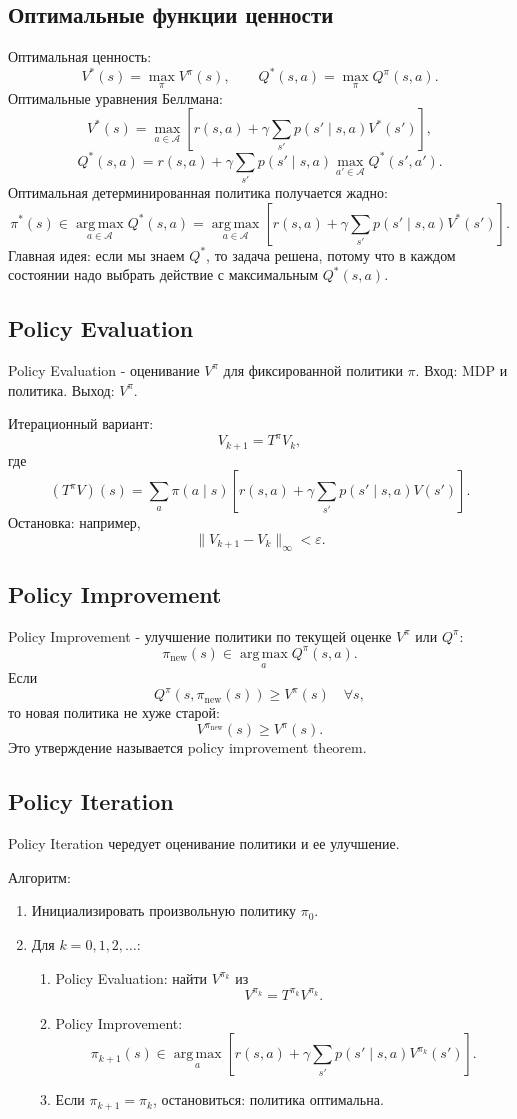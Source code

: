 \documentclass[11pt,a4paper]{article}
\newcommand{\argmax}{\operatorname*{arg\,max}}
\newcommand{\1}{\mathbf{1}}
\newcommand{\cA}{\mathcal A}
\begin{document}
\subsection*{Оптимальные функции ценности}
Оптимальная ценность:
\[
    V^*(s)=\max_\pi V^\pi(s),
    \qquad
    Q^*(s,a)=\max_\pi Q^\pi(s,a).
\]
Оптимальные уравнения Беллмана:
\[
    V^*(s)=\max_{a\in\cA}\left[r(s,a)+\gamma\sum_{s'}p(s'\mid s,a)V^*(s')\right],
\]
\[
    Q^*(s,a)=r(s,a)+\gamma\sum_{s'}p(s'\mid s,a)\max_{a'\in\cA}Q^*(s',a').
\]
Оптимальная детерминированная политика получается жадно:
\[
    \pi^*(s)\in\argmax_{a\in\cA}Q^*(s,a)
= \argmax_{a\in\cA}\left[r(s,a)+\gamma\sum_{s'}p(s'\mid s,a)V^*(s')\right].
\]
Главная идея: если мы знаем $Q^*$, то задача решена, потому что в каждом состоянии надо выбрать действие с максимальным $Q^*(s,a)$.

\subsection*{Policy Evaluation}
Policy Evaluation - оценивание $V^\pi$ для фиксированной политики $\pi$. Вход: MDP и политика. Выход: $V^\pi$.

Итерационный вариант:
\[
    V_{k+1}=T^\pi V_k,
\]
где
\[
    (T^\pi V)(s)=\sum_a\pi(a\mid s)\left[r(s,a)+\gamma\sum_{s'}p(s'\mid s,a)V(s')\right].
\]
Остановка: например,
\[
    \|V_{k+1}-V_k\|_\infty<\varepsilon.
\]

\subsection*{Policy Improvement}
Policy Improvement - улучшение политики по текущей оценке $V^\pi$ или $Q^\pi$:
\[
    \pi_{\text{new}}(s)\in\argmax_a Q^\pi(s,a).
\]
Если
\[
    Q^\pi(s,\pi_{\text{new}}(s))\ge V^\pi(s)\quad \forall s,
\]
то новая политика не хуже старой:
\[
    V^{\pi_{\text{new}}}(s)\ge V^\pi(s).
\]
Это утверждение называется policy improvement theorem.

\subsection*{Policy Iteration}
Policy Iteration чередует оценивание политики и ее улучшение.

Алгоритм:
\begin{enumerate}
    \item Инициализировать произвольную политику $\pi_0$.
    \item Для $k=0,1,2,\dots$:
    \begin{enumerate}
        \item Policy Evaluation: найти $V^{\pi_k}$ из
        \[
            V^{\pi_k}=T^{\pi_k}V^{\pi_k}.
        \]
        \item Policy Improvement:
        \[
            \pi_{k+1}(s)\in\argmax_a\left[r(s,a)+\gamma\sum_{s'}p(s'\mid s,a)V^{\pi_k}(s')\right].
        \]
        \item Если $\pi_{k+1}=\pi_k$, остановиться: политика оптимальна.
    \end{enumerate}
\end{enumerate}
\end{document}
